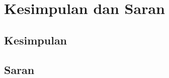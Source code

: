 \chapter{Kesimpulan dan Saran}
\label{chap:kesimpulan}

\section{Kesimpulan}
\label{sec:kesimpulan}

\section{Saran}
\label{sec:saran}
